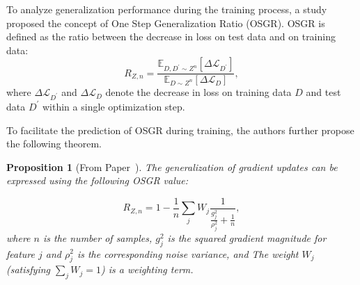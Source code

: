 \documentclass{article}
\theoremstyle{plain}
\newtheorem{proposition}[theorem]{Proposition}
\theoremstyle{definition}
\theoremstyle{remark}
\begin{document}
To analyze generalization performance during the training process, a study proposed the concept of One Step Generalization Ratio (OSGR)\cite{understanding}. OSGR is defined as the ratio between the decrease in loss on test data and on training data:
\begin{equation}
R_{Z, n} = \frac{\mathbb{E}_{D, D^\prime \sim Z^n}[\Delta \mathcal{L}_{D^\prime}]}{\mathbb{E}_{D \sim Z^n}[\Delta \mathcal{L}_D]},
\end{equation}
where $\Delta \mathcal{L}_{D^\prime} $ and $\Delta \mathcal{L}_D$  denote the decrease in loss on training data $D$ and test data $D^\prime$ within a single optimization step.

To facilitate the prediction of OSGR during training, the authors further propose the following theorem.

\begin{proposition}[From Paper~\cite{understanding}]\label{thm:th2}
The generalization of gradient updates can be expressed using the following OSGR value:

\begin{equation}
R_{Z, n} = 1 - \frac{1}{n} \sum_j W_j\frac{1}{ \frac{g_j^2}{\rho_j^2} + \frac{1}{n}},
\end{equation}
where $n$ is the number of samples, $g_j^2$ is the squared gradient magnitude for feature $j$ and $\rho_j^2$ is the corresponding noise variance, and The weight $W_j$ (satisfying $\sum_j W_j = 1$) is a weighting term.
\end{proposition}
\end{document}
